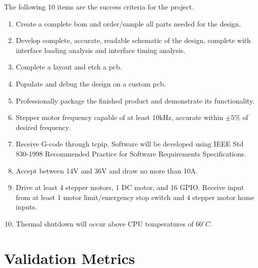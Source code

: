 The following 10 items are the success criteria for the project. 
\begin{enumerate}
	\item Create a complete \gls{bom} and order/sample all parts needed for the design.
	\item Develop complete, accurate, readable schematic of the design, complete with interface loading analysis and interface timing analysis. 
	\item Complete a layout and etch a \gls{pcb}.
	\item Populate and debug the design on a custom \gls{pcb}.
	\item Professionally package the finished product and demonstrate its functionality.
	\item Stepper motor frequency capable of at least 10kHz, accurate within $\pm5\%$ of desired frequency.
	\item Receive G-code through \gls{tcpip}. Software will be developed using IEEE Std 830-1998 Recommended Practice for Software Requirements Specifications.
	\item Accept between 14V and 36V and draw no more than 10A.
	\item Drive at least 4 stepper motors, 1 DC motor, and 16 GPIO. Receive input from at least 1 motor limit/emergency stop switch and 4 stepper motor home inputs.
	\item Thermal shutdown will occur above CPU temperatures of $60^{\circ}C$.
\end{enumerate}
\section{Validation Metrics}
